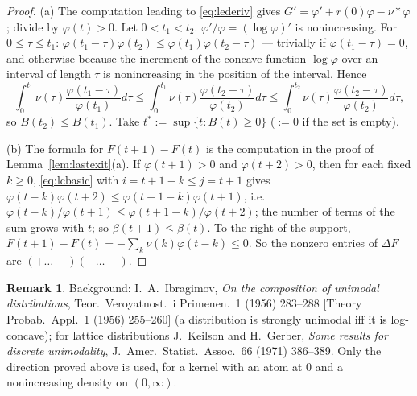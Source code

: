 \documentclass[11pt,a4paper]{article}
\theoremstyle{definition}
\newtheorem*{remarku}{Remark}
\begin{document}
\begin{proof}
(a) The computation leading to \eqref{eq:lederiv} gives $G'=\varphi'+r(0)\varphi-\nu*\varphi$; divide by $\varphi(t)>0$. Let $0<t_1<t_2$. $\varphi'/\varphi=(\log\varphi)'$ is nonincreasing. For $0\le\tau\le t_1$: $\varphi(t_1-\tau)\varphi(t_2)\le\varphi(t_1)\varphi(t_2-\tau)$ --- trivially if $\varphi(t_1-\tau)=0$, and otherwise because the increment of the concave function $\log\varphi$ over an interval of length $\tau$ is nonincreasing in the position of the interval. Hence
\[
\int_0^{t_1}\nu(\tau)\frac{\varphi(t_1-\tau)}{\varphi(t_1)}d\tau\le\int_0^{t_1}\nu(\tau)\frac{\varphi(t_2-\tau)}{\varphi(t_2)}d\tau\le\int_0^{t_2}\nu(\tau)\frac{\varphi(t_2-\tau)}{\varphi(t_2)}d\tau ,
\]
so $B(t_2)\le B(t_1)$. Take $t^*:=\sup\{t:B(t)\ge0\}$ ($:=0$ if the set is empty).

(b) The formula for $F(t+1)-F(t)$ is the computation in the proof of Lemma~\ref{lem:lastexit}(a). If $\varphi(t+1)>0$ and $\varphi(t+2)>0$, then for each fixed $k\ge0$, \eqref{eq:lcbasic} with $i=t+1-k\le j=t+1$ gives $\varphi(t-k)\varphi(t+2)\le\varphi(t+1-k)\varphi(t+1)$, i.e.\ $\varphi(t-k)/\varphi(t+1)\le\varphi(t+1-k)/\varphi(t+2)$; the number of terms of the sum grows with $t$; so $\beta(t+1)\le\beta(t)$. To the right of the support, $F(t+1)-F(t)=-\sum_k\nu(k)\varphi(t-k)\le0$. So the nonzero entries of $\Delta F$ are $(+\dots+)(-\dots-)$.
\end{proof}

\begin{remarku}
Background: I.~A.~Ibragimov, \emph{On the composition of unimodal distributions}, Teor.\ Veroyatnost.\ i Primenen.\ 1 (1956) 283--288 [Theory Probab.\ Appl.\ 1 (1956) 255--260] (a distribution is strongly unimodal iff it is log-concave); for lattice distributions J.~Keilson and H.~Gerber, \emph{Some results for discrete unimodality}, J.~Amer.\ Statist.\ Assoc.\ 66 (1971) 386--389. Only the direction proved above is used, for a kernel with an atom at $0$ and a nonincreasing density on $(0,\infty)$.
\end{remarku}
\end{document}

